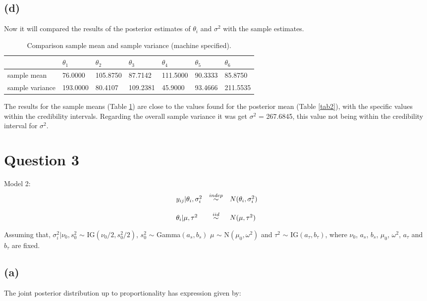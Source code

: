 \documentclass[a4paper, 11pt]{article}
\begin{document}
\subsection*{(d)} Now it will compared the results of the posterior estimates of $\theta_i$ and $\sigma^2$ with the sample estimates.

\begin{table}[H]
\centering
\begin{tabular}{lllllll}
\hline
& $\theta_1$  & $\theta_2$ & $\theta_3$ & $\theta_4$ & $\theta_5$ & $\theta_6$ \\
\hline
sample mean & 76.0000     & 105.8750    & 87.7142      & 111.5000     & 90.3333     & 85.8750      \\    
\hline
sample variance & 193.0000 & 80.4107 & 109.2381 &  45.9000 & 93.4666 & 211.5535 \\
\hline
\end{tabular}
\caption{Comparison sample mean and sample variance (machine specified).}
\label{tab3}
\end{table}

The results for the sample means (Table \ref{tab3}) are close to the values found for the posterior mean (Table \ref{tab2}), with the specific values within the credibility intervals. Regarding the overall sample variance it was get $\sigma^2$ = 267.6845, this value not being within the credibility interval for $\sigma^2$.

\section*{Question 3}
Model 2:
\begin{equation*}
\begin{array}{lcl ll }
y_{ij}|\theta_i,\sigma_i^2 & \stackrel{indep}{\sim} & N(\theta_i,\sigma_i^2) \\ \\

\theta_i | \mu, \tau^2 & \stackrel{iid}{\sim} & N(\mu,\tau^2) \\
 \end{array}
\end{equation*}

Assuming that, $\sigma_i^2|\nu_0, s^2	_0$ $\sim$ IG$(\nu_0/2,s_0^2/2)$, $s_0^2$ $\sim$ Gamma$(a_s,b_s)$ $\mu$ $\sim$ N$(\mu_0,\omega^2)$ and $\tau^2$ $\sim$ IG$(a_\tau, b_\tau)$, where $\nu_0$, $a_s$, $b_s$, $\mu_0$, $\omega^2$, $a_\tau$ and $b_\tau$ are fixed.

\subsection*{(a)} The joint posterior distribution up to proportionality has expression given by:
\end{document}

